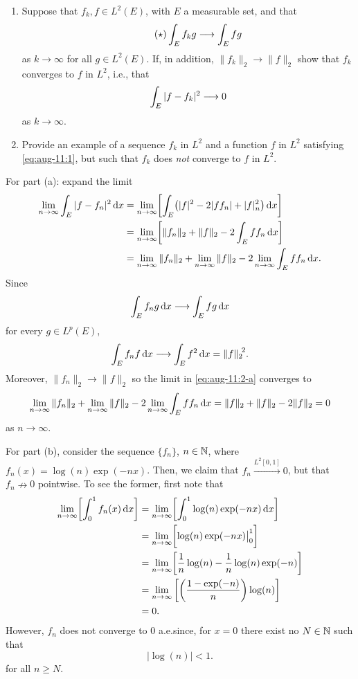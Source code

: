 \begin{problem}
  \hfill
  \begin{enumerate}[label=(\alph*),noitemsep]
  \item Suppose that \(f_k,f\in L^2(E)\), with \(E\) a measurable set, and
    that
    \[
      \label{eq:aug-11:1}
      \tag{\(\bigstar\)}
      \int_E f_kg\too\int_E fg
    \]
    as \(k\to\infty\) for all \(g\in L^2(E)\). If, in addition,
    \(\|f_k\|_2\to\|f\|_2\) show that \(f_k\) converges to \(f\) in
    \(L^2\), i.e., that
    \[
      \int_E|f-f_k|^2\longrightarrow 0
    \]
    as \(k\to\infty\).
  \item Provide an example of a sequence \(f_k\) in \(L^2\) and a function
    \(f\) in \(L^2\) satisfying \eqref{eq:aug-11:1}, but such that \(f_k\)
    does \emph{not} converge to \(f\) in \(L^2\).
  \end{enumerate}
\end{problem}
\begin{solution}
  For part (a): expand the limit
  \begin{gather}
    \label{eq:aug-11:2-a}
    \begin{aligned}
      \lim_{n\to\infty}\int_E|f-f_n|^2\mathop{}\!\mathrm{d} x
      &=\lim_{n\to\infty}\biggl[\int_E\bigl(|f|^2-2|ff_n|+|f|_n^2\bigr)\mathop{}\!\mathrm{d} x\biggr]\\
      &=\lim_{n\to\infty}\biggl[\|f_n\|_2+\|f\|_2-2\int_E ff_n\mathop{}\!\mathrm{d} x\biggr]\\
      &=\lim_{n\to\infty}\|f_n\|_2+\lim_{n\to\infty}\|f\|_2-2\lim_{n\to\infty}\int_E
      ff_n\mathop{}\!\mathrm{d} x.
    \end{aligned}
  \end{gather}
  Since
  \[
    \int_Ef_ng\mathop{}\!\mathrm{d} x\longrightarrow \int_E fg\mathop{}\!\mathrm{d} x
  \]
  for every \(g\in L^p(E)\),
  \[
    \int_E f_nf\mathop{}\!\mathrm{d} x\longrightarrow \int_Ef^2\mathop{}\!\mathrm{d} x={\|f\|_2}^{\!2}.
  \]
  Moreover, \(\|f_n\|_2\to\|f\|_2\) so the limit in \eqref{eq:aug-11:2-a}
  converges to
  \[
    \lim_{n\to\infty}\|f_n\|_2+\lim_{n\to\infty}\|f\|_2-2\lim_{n\to\infty}\int_E
    ff_n\diff x
    =%
    \|f\|_2+\|f\|_2-2\|f\|_2=0
  \]
  as \(n\to\infty\).

  For part (b), consider the sequence \(\{f_n\}\), \(n\in\mathbb{N}\), where
  \(f_n(x)=\log(n)\exp(-nx)\). Then, we claim that
  \(f_n\xrightarrow{L^2[0,1]}0\), but that \(f_n\nrightarrow 0\)
  pointwise. To see the former, first note that
  \[
    \begin{aligned}
      \lim_{n\to\infty}\biggl[\int_0^1 f_n(x)\diff x\biggr]
      &=\lim_{n\to\infty}\biggl[\int_0^1\log(n)\exp(-nx)\diff x\biggr]\\
      &=\lim_{n\to\infty}\biggl[\log(n)\exp(-nx)\bigr|_0^1\biggr]\\
      &=\lim_{n\to\infty}\biggl[
      \frac{1}{n}\log(n)-\frac{1}{n}\log(n)\exp(-n)
      \biggr]\\
      &=\lim_{n\to\infty}\left[%
        \biggl(\frac{1-\exp(-n)}{n}\biggr)\log(n)%
      \right]\\
      &=0.
    \end{aligned}
  \]
  However, \(f_n\) does not converge to \(0\) a.e.\@ since, for
  \(x=0\) there exist no \(N\in\mathbb{N}\) such that
  \[
    |\log(n)|<1.
  \]
  for all \(n\geq N\).
\end{solution}

